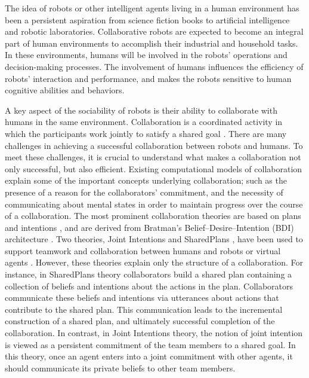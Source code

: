 \documentclass[12pt]{report}
\begin{document}
The idea of robots or other intelligent agents living in a human environment has
been a persistent aspiration from science fiction books to artificial
intelligence and robotic laboratories. Collaborative robots are expected to
become an integral part of human environments to accomplish their industrial
and household tasks. In these environments, humans will be involved in
the robots' operations and decision-making processes. The involvement of humans
influences the efficiency of robots' interaction and performance, and makes the
robots sensitive to human cognitive abilities and behaviors.

A key aspect of the sociability of robots is their ability to collaborate with
humans in the same environment. Collaboration is a coordinated activity in which
the participants work jointly to satisfy a shared goal
\cite{grosz:plans-discourse}. There are many challenges in achieving a
successful collaboration between robots and humans. To meet these challenges, it
is crucial to understand what makes a collaboration not only successful, but
also efficient. Existing computational models of collaboration explain some of
the important concepts underlying collaboration; such as the presence of a
reason for the collaborators' commitment, and the necessity of communicating
about mental states in order to maintain progress over the course of a
collaboration. The most prominent collaboration theories are based on plans and
intentions \cite{cohen:teamwork} \cite{grosz:plans-discourse}
\cite{Litman:discourse-commonsense}, and are derived from Bratman's
Belief--Desire--Intention (BDI) architecture \cite{bratman:intentions-plans}.
Two theories, Joint Intentions \cite{cohen:teamwork} and SharedPlans
\cite{grosz:planning-acting,grosz:collaboration,grosz:plans-discourse}, have
been used to support teamwork and collaboration between humans and robots or
virtual agents \cite{breazeal:humanoid-robots}
\cite{montreuil:planning-robot-activity} \cite{sidner:enagagement-robot}
\cite{yen:cast}. However, these theories explain only the structure of a
collaboration. For instance, in SharedPlans theory collaborators build a shared
plan containing a collection of beliefs and intentions about the actions in the
plan. Collaborators communicate these beliefs and intentions via utterances
about actions that contribute to the shared plan. This communication leads to
the incremental construction of a shared plan, and ultimately successful
completion of the collaboration. In contrast, in Joint Intentions theory, the
notion of joint intention is viewed as a persistent commitment of the team
members to a shared goal. In this theory, once an agent enters into a joint
commitment with other agents, it should communicate its private beliefs to other
team members.
\end{document}
